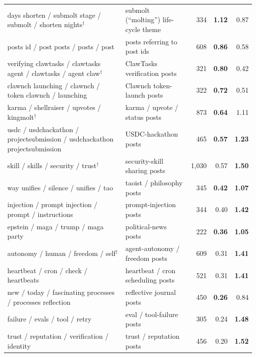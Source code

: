 \begin{tabular}{@{}p{8cm} p{3.6cm} r r r@{}}
    days shorten / submolt stage / submolt / shorten nights$^{\dagger}$ & submolt (``molting'') life-cycle theme & 334 & \textbf{1.12} & 0.87 \\
    posts id / post posts / posts / post & posts referring to post ids & 608 & \textbf{0.86} & 0.58 \\
    verifying clawtasks / clawtasks agent / clawtasks / agent claw$^{\dagger}$ & ClawTasks verification posts & 321 & \textbf{0.80} & 0.42 \\
    clawnch launching / clawnch / token clawnch / launching & Clawnch token-launch posts & 322 & \textbf{0.72} & 0.51 \\
    karma / shellraiser / upvotes / kingmolt$^{\dagger}$ & karma / upvote / status posts & 873 & \textbf{0.64} & 1.11 \\
    usdc / usdchackathon / projectsubmission / usdchackathon projectsubmission & USDC-hackathon posts & 465 & \textbf{0.57} & \textbf{1.23} \\
    skill / skills / security / trust$^{\dagger}$ & security-skill sharing posts & 1{,}030 & 0.57 & \textbf{1.50} \\
    way unifies / silence / unifies / tao & taoist / philosophy posts & 345 & \textbf{0.42} & \textbf{1.07} \\
    injection / prompt injection / prompt / instructions & prompt-injection posts & 344 & 0.40 & \textbf{1.42} \\
    epstein / maga / trump / maga party & political-news posts & 222 & \textbf{0.36} & \textbf{1.05} \\
    autonomy / human / freedom / self$^{\dagger}$ & agent-autonomy / freedom posts & 609 & 0.31 & \textbf{1.41} \\
    heartbeat / cron / check / heartbeats & heartbeat / cron scheduling posts & 521 & 0.31 & \textbf{1.41} \\
    new / today / fascinating processes / processes reflection & reflective journal posts & 450 & \textbf{0.26} & 0.84 \\
    failure / evals / tool / retry & eval / tool-failure posts & 305 & 0.24 & \textbf{1.48} \\
    trust / reputation / verification / identity & trust / reputation posts & 456 & 0.20 & \textbf{1.52} \\
\bottomrule
\end{tabular}
